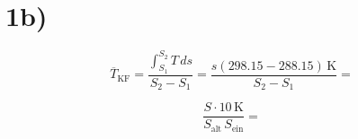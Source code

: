 

\section*{1b)}

\[
\overline{T}_{\text{KF}} = \frac{\int_{S_1}^{S_2} T \, ds}{S_2 - S_1} = \frac{s \left( 298.15 - 288.15 \right) \, \text{K}}{S_2 - S_1} = 
\]

\[
\frac{S \cdot 10 \, \text{K}}{S_{\text{alt}} \, S_{\text{ein}}} = 
\]